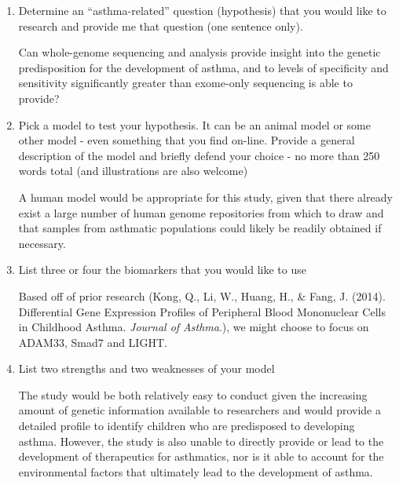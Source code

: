 \documentclass[11pt,final] {article}
\begin{document}
\begin{enumerate}
	\item Determine an ``asthma-related'' question (hypothesis) that you would like to research and provide me that question (one sentence only).
	
	Can whole-genome sequencing and analysis provide insight into the genetic predisposition for the development of asthma, and to levels of specificity and sensitivity significantly greater than exome-only sequencing is able to provide?
	
	\item Pick a model to test your hypothesis. It can be an animal model or some other model - even something that you find on-line. Provide a general description of the model and briefly defend your choice - no more than 250 words total (and illustrations are also welcome)
	
	A human model would be appropriate for this study, given that there already exist a large number of human genome repositories from which to draw and that samples from asthmatic populations could likely be readily obtained if necessary.
	
	\item List three or four the biomarkers that you would like to use
	
	Based off of prior research (Kong, Q., Li, W., Huang, H., \& Fang, J. (2014). Differential Gene Expression Profiles of Peripheral Blood Mononuclear Cells in Childhood Asthma. \textit{Journal of Asthma}.), we might choose to focus on ADAM33, Smad7 and LIGHT.
	
	\item List two strengths and two weaknesses of your model
	
	The study would be both relatively easy to conduct given the increasing amount of genetic information available to researchers and would provide a detailed profile to identify children who are predisposed to developing asthma. However, the study is also unable to directly provide or lead to the development of therapeutics for asthmatics, nor is it able to account for the environmental factors that ultimately lead to the development of asthma.
	
\end{enumerate}
\end{document}
